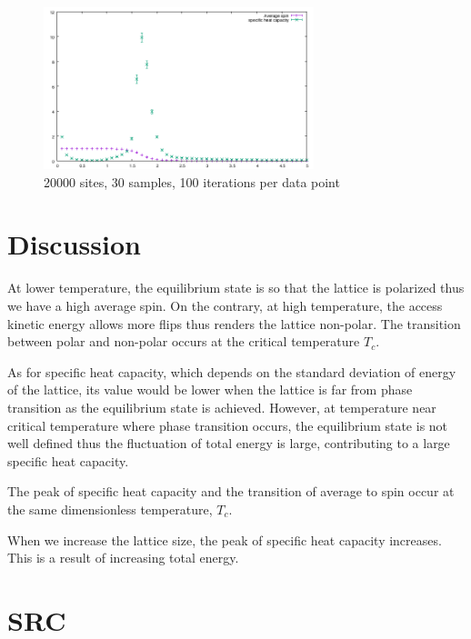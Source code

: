 \documentclass{article}
\begin{document}
\begin{figure}[H]
  \centering
  \includegraphics[width = 0.7\textwidth]{figures/20000_sites_100_iterations_30_samples.png}
  \caption{20000 sites, 30 samples, 100 iterations per data point}
  \label{fig:100_30_100}
\end{figure}

\section{Discussion}
\label{sec-4}

At lower temperature, the equilibrium state is so that the lattice
is polarized thus we have a high average spin. On the contrary, at
high temperature, the access kinetic energy allows more flips thus
renders the lattice non-polar. The transition between polar and
non-polar occurs at the critical temperature $T_c$.

As for specific heat capacity, which depends on the standard
deviation of energy of the lattice, its value would be lower when
the lattice is far from phase transition as the equilibrium state is
achieved. However, at temperature near critical temperature where
phase transition occurs, the equilibrium state is not well defined
thus the fluctuation of total energy is large, contributing to a
large specific heat capacity.

The peak of specific heat capacity and the transition of average to
spin occur at the same dimensionless temperature, $T_c$.

When we increase the lattice size, the peak of specific heat
capacity increases. This is a result of increasing total energy.

\section{SRC}
\label{sec-5}
\end{document}
